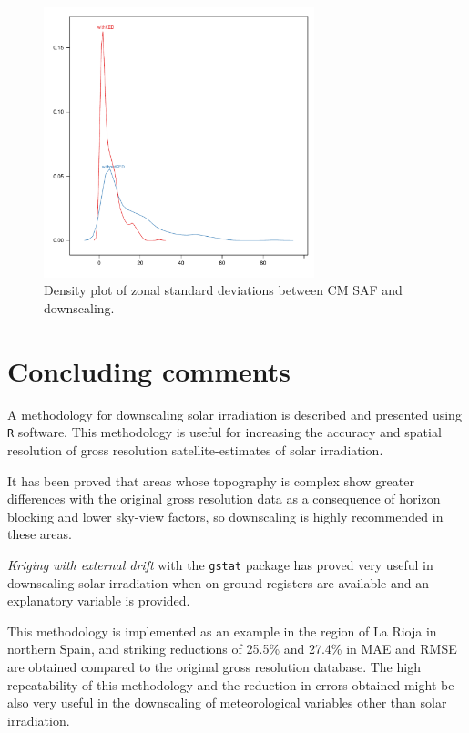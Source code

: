\documentclass[11pt, english]{article}
\begin{document}
\begin{figure}[H]
  \centering
  \includegraphics[width=0.7\textwidth]{density.pdf}
  \caption{Density plot of zonal standard deviations between CM SAF and downscaling.}
  \label{fig:density}
\end{figure}


\section{Concluding comments}

A methodology for downscaling solar irradiation is described and
presented using \texttt{R} software. This methodology is useful for
increasing the accuracy and spatial resolution of gross resolution
satellite-estimates of solar irradiation.

It has been proved that areas whose topography is complex show greater
differences with the original gross resolution data as a consequence
of horizon blocking and lower sky-view factors, so downscaling is
highly recommended in these areas.

\emph{Kriging with external drift} with the \texttt{gstat} package has
proved very useful in downscaling solar irradiation when on-ground
registers are available and an explanatory variable is provided.

This methodology is implemented as an example in the region of La
Rioja in northern Spain, and striking reductions of 25.5\% and 27.4\%
in MAE and RMSE are obtained compared to the original gross resolution
database. The high repeatability of this methodology and the reduction
in errors obtained might be also very useful in the downscaling of
meteorological variables other than solar irradiation.
\end{document}
